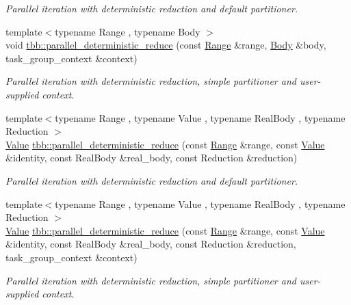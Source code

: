 \begin{DoxyCompactItemize}
\begin{DoxyCompactList}\small\item\em Parallel iteration with deterministic reduction and default partitioner. \end{DoxyCompactList}\item 
{\footnotesize template$<$typename Range , typename Body $>$ }\\void \hyperlink{group__algorithms_ga361201f81b4ec7b86f81b579d2db647a}{tbb\+::parallel\+\_\+deterministic\+\_\+reduce} (const \hyperlink{classtbb_1_1blocked__range}{Range} \&range, \hyperlink{classBody}{Body} \&body, task\+\_\+group\+\_\+context \&context)
\begin{DoxyCompactList}\small\item\em Parallel iteration with deterministic reduction, simple partitioner and user-\/supplied context. \end{DoxyCompactList}\item 
{\footnotesize template$<$typename Range , typename Value , typename Real\+Body , typename Reduction $>$ }\\\hyperlink{structValue}{Value} \hyperlink{group__algorithms_ga7f69e6a632acb51ed26a43ebd331f349}{tbb\+::parallel\+\_\+deterministic\+\_\+reduce} (const \hyperlink{classtbb_1_1blocked__range}{Range} \&range, const \hyperlink{structValue}{Value} \&identity, const Real\+Body \&real\+\_\+body, const Reduction \&reduction)
\begin{DoxyCompactList}\small\item\em Parallel iteration with deterministic reduction and default partitioner. \end{DoxyCompactList}\item 
{\footnotesize template$<$typename Range , typename Value , typename Real\+Body , typename Reduction $>$ }\\\hyperlink{structValue}{Value} \hyperlink{group__algorithms_ga69b4eea059a62cbbf409cbad02b70bfa}{tbb\+::parallel\+\_\+deterministic\+\_\+reduce} (const \hyperlink{classtbb_1_1blocked__range}{Range} \&range, const \hyperlink{structValue}{Value} \&identity, const Real\+Body \&real\+\_\+body, const Reduction \&reduction, task\+\_\+group\+\_\+context \&context)
\begin{DoxyCompactList}\small\item\em Parallel iteration with deterministic reduction, simple partitioner and user-\/supplied context. \end{DoxyCompactList}\end{DoxyCompactItemize}
